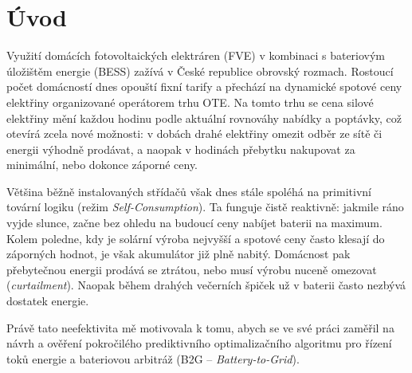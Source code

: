 \documentclass[FM,BP]{tulthesis}
\begin{document}
	\chapter{Úvod}
	\label{chap:uvod}

	Využití domácích fotovoltaických elektráren (FVE) v kombinaci s bateriovým úložištěm energie (BESS) zažívá v České republice obrovský rozmach. Rostoucí počet domácností dnes opouští fixní tarify a přechází na dynamické spotové ceny elektřiny organizované operátorem trhu OTE. Na tomto trhu se cena silové elektřiny mění každou hodinu podle aktuální rovnováhy nabídky a poptávky, což otevírá zcela nové možnosti: v dobách drahé elektřiny omezit odběr ze sítě či energii výhodně prodávat, a naopak v hodinách přebytku nakupovat za minimální, nebo dokonce záporné ceny.

	Většina běžně instalovaných střídačů však dnes stále spoléhá na primitivní tovární logiku (režim \textit{Self-Consumption}). Ta funguje čistě reaktivně: jakmile ráno vyjde slunce, začne bez ohledu na budoucí ceny nabíjet baterii na maximum. Kolem poledne, kdy je solární výroba nejvyšší a spotové ceny často klesají do záporných hodnot, je však akumulátor již plně nabitý. Domácnost pak přebytečnou energii prodává se ztrátou, nebo musí výrobu nuceně omezovat (\textit{curtailment}). Naopak během drahých večerních špiček už v baterii často nezbývá dostatek energie.

	Právě tato neefektivita mě motivovala k tomu, abych se ve své práci zaměřil na návrh a ověření pokročilého prediktivního optimalizačního algoritmu pro řízení toků energie a bateriovou arbitráž (B2G -- \textit{Battery-to-Grid}).
\end{document}
